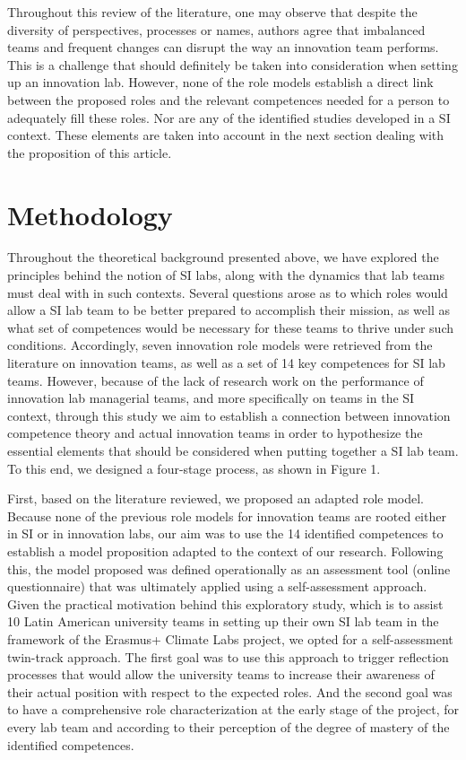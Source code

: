 \documentclass[AMA,STIX1COL,APA,STIX2COL]{WileyNJD-v2}
\begin{document}
Throughout this review of the literature, one may observe that despite
the diversity of perspectives, processes or names, authors agree that
imbalanced teams and frequent changes can disrupt the way an innovation
team performs. This is a challenge that should definitely be taken into
consideration when setting up an innovation lab. However, none of the
role models establish a direct link between the proposed roles and the
relevant competences needed for a person to adequately fill these roles.
Nor are any of the identified studies developed in a SI context. These
elements are taken into account in the next section dealing with the
proposition of this article.

\hypertarget{methodology}{%
\section{Methodology}\label{methodology}}

Throughout the theoretical background presented above, we have explored
the principles behind the notion of SI labs, along with the dynamics
that lab teams must deal with in such contexts. Several questions arose
as to which roles would allow a SI lab team to be better prepared to
accomplish their mission, as well as what set of competences would be
necessary for these teams to thrive under such conditions. Accordingly,
seven innovation role models were retrieved from the literature on
innovation teams, as well as a set of 14 key competences for SI lab
teams. However, because of the lack of research work on the performance
of innovation lab managerial teams, and more specifically on teams in
the SI context, through this study we aim to establish a connection
between innovation competence theory and actual innovation teams in
order to hypothesize the essential elements that should be considered
when putting together a SI lab team. To this end, we designed a
four-stage process, as shown in Figure 1.

First, based on the literature reviewed, we proposed an adapted role
model. Because none of the previous role models for innovation teams are
rooted either in SI or in innovation labs, our aim was to use the 14
identified competences to establish a model proposition adapted to the
context of our research. Following this, the model proposed was defined
operationally as an assessment tool (online questionnaire) that was
ultimately applied using a self-assessment approach. Given the practical
motivation behind this exploratory study, which is to assist 10 Latin
American university teams in setting up their own SI lab team in the
framework of the Erasmus+ Climate Labs project, we opted for a
self-assessment twin-track approach. The first goal was to use this
approach to trigger reflection processes that would allow the university
teams to increase their awareness of their actual position with respect
to the expected roles. And the second goal was to have a comprehensive
role characterization at the early stage of the project, for every lab
team and according to their perception of the degree of mastery of the
identified competences.
\end{document}
